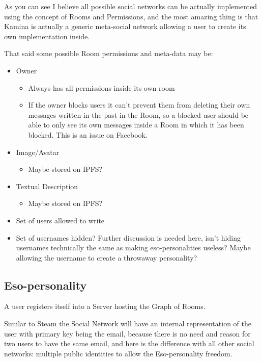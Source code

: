 \documentclass[12pt]{article}
\begin{document}
As you can see I believe all possible social networks can be actually implemented using the concept of Rooms and Permissions, and the most amazing thing is that Kamina is actually a generic meta-social network allowing a user to create its own implementation inside.
\newline

That said some possible Room permissions and meta-data may be:

\begin{itemize}
    \item Owner
    \begin{itemize}
        \item Always has all permissions inside its own room
        \item If the owner blocks users it can't prevent them from deleting their own messages written in the past in the Room, so a blocked user should be able to only see its own messages inside a Room in which it has been blocked. This is an issue on Facebook.
    \end{itemize}
    \item Image/Avatar
    \begin{itemize}
        \item Maybe stored on IPFS?
    \end{itemize}
    \item Textual Description
    \begin{itemize}
        \item Maybe stored on IPFS?
    \end{itemize}
    \item Set of users allowed to write
    \item Set of usernames hidden?
    Further discussion is needed here, isn't hiding usernames technically the same as making eso-personalities useless?
    Maybe allowing the username to create a throwaway personality?

\end{itemize}


\subsection{Eso-personality}

A user registers itself into a Server hosting the Graph of Rooms.

Similar to Steam the Social Network will have an internal representation of the user with primary key being the email, because there is no need and reason for two users to have the same email, and here is the difference with all other social networks: multiple public identities to allow the Eso-personality freedom.
\end{document}
